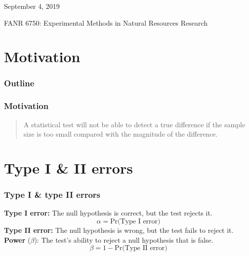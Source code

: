 \documentclass[color=usenames,dvipsnames]{beamer}\usepackage[]{graphicx}\usepackage[]{color}
\begin{document}
\begin{frame}[plain]
  \begin{center}
    \Large
    {\color{NavyBlue}{\huge \bf Power Analysis \\}}
    \vspace{2cm}
    \large
    { September 4, 2019} \par
    \vspace{1cm}
    \large
    {FANR 6750: Experimental Methods in Natural Resources
      Research}  \par
  \end{center}
\end{frame}



\section{Motivation}



\begin{frame}[plain]
  \frametitle{Outline}
   \LARGE
\end{frame}



\begin{frame}
  \frametitle{Motivation}
  \large
  \begin{quote}
    A statistical test will not be able to detect a true difference if
    the sample size is too small compared with the magnitude of the
    difference.
  \end{quote}
\end{frame}




\section{Type I \& II errors}


\begin{frame}
  \frametitle{Type I \& type II errors}
  {\bf Type I error:} The null hypothesis is correct, but the test rejects it.
  \pause
  \[
    \alpha = \text{Pr(Type I error)} %
  \]
  \pause
  \vfill
  {\bf Type II error:} The null hypothesis is wrong, but the test fails to reject it.
  \pause
  \vfill
  {\bf Power} ($\beta$): The test's ability to reject a null hypothesis that is false.
  \[
    \beta = 1 - \text{Pr(Type II error)} %
  \]
\end{frame}
\end{document}
